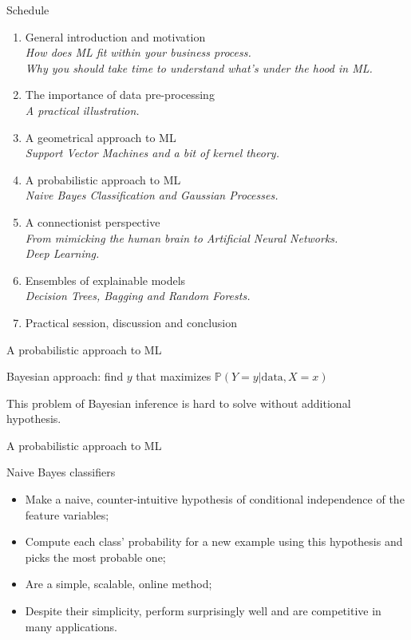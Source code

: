 \documentclass{beamer}
\begin{document}
\begin{frame}{Schedule}
\begin{enumerate}
\item General introduction and motivation \Checkmark \\
{\small \it How does ML fit within your business process.\\
Why you should take time to understand what's under the hood in ML.}
\item The importance of data pre-processing \Checkmark \\
{\small \it A practical illustration.}
\item A geometrical approach to ML \Checkmark \\
{\small \it Support Vector Machines and a bit of kernel theory.}
\item A probabilistic approach to ML\\
{\small \it Naive Bayes Classification and Gaussian Processes.}
\item A connectionist perspective \\
{\small \it From mimicking the human brain to Artificial Neural Networks.\\
Deep Learning.}
\item Ensembles of explainable models\\
{\small \it Decision Trees, Bagging and Random Forests.}
\item Practical session, discussion and conclusion
\end{enumerate}
\end{frame}

\begin{frame}{A probabilistic approach to ML}
\begin{block}{}
Bayesian approach: find $y$ that maximizes $\mathbb{P}(Y=y|\textrm{data}, X=x)$
\end{block}
This problem of Bayesian inference is hard to solve without additional hypothesis.
\end{frame}

\begin{frame}{A probabilistic approach to ML}
\begin{block}{Naive Bayes classifiers}
\begin{itemize}
\item Make a naive, counter-intuitive hypothesis of conditional independence of the feature variables;
\item Compute each class' probability for a new example using this hypothesis and picks the most probable one;
\item Are a simple, scalable, online method;
\item Despite their simplicity, perform surprisingly well and are competitive in many applications.
\end{itemize}
\end{block}

\end{frame}
\end{document}
